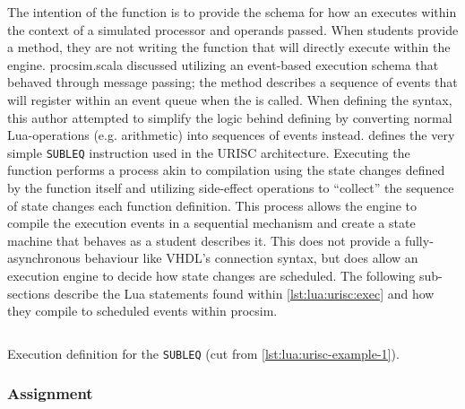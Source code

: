 The intention of the  function is to provide the schema for how an  executes within the context of a simulated processor and operands passed. When students provide a  method, they are not writing the function that will directly execute within the engine. procsim.scala discussed utilizing an event-based execution schema that behaved through message passing; the  method describes a sequence of events that will register within an event queue when the  is called. When defining the syntax, this author attempted to simplify the logic behind defining  by converting normal Lua-operations (e.g. arithmetic) into sequences of events instead.  defines the very simple \texttt{SUBLEQ} instruction used in the URISC architecture. Executing the  function performs a process akin to compilation using the state changes defined by the function itself and utilizing side-effect operations to ``collect'' the sequence of state changes each function definition. This process allows the engine to compile the execution events in a sequential mechanism and create a state machine that behaves as a student describes it. This does not provide a fully-asynchronous behaviour like VHDL's connection syntax, but does allow an execution engine to decide how state changes are scheduled. The following sub-sections describe the Lua statements found within \cref{lst:lua:urisc:exec} and how they compile to scheduled events within procsim.  

\begin{listing}[h!]
    \inputminted[escapeinside=||, firstline=61, lastline=74]{lua}{./listings/urisc.lua}
    \caption{Execution definition for the \texttt{SUBLEQ}  (cut from \cref{lst:lua:urisc-example-1}).}
    \label{lst:lua:urisc:exec}
\end{listing}

\subsubsection*{Assignment}

